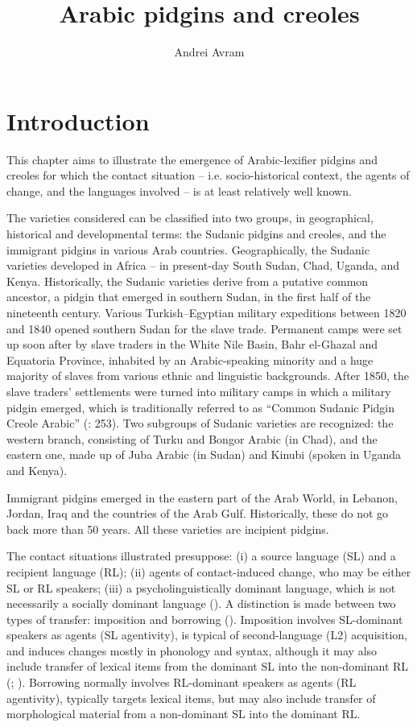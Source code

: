 \documentclass[output=paper]{langsci/langscibook}
\author{Andrei Avram\affiliation{University of Bucharest}}
\title{Arabic pidgins and creoles}
\begin{document}
\maketitle 


\section{Introduction}

This chapter aims to illustrate the emergence of Arabic-lexifier pidgins and creoles for which the contact situation – i.e. socio-historical context, the agents of change, and the languages involved – is at least relatively well known.

  The varieties considered can be classified into two groups, in geographical, historical and developmental terms: the Sudanic pidgins and creoles, and the immigrant pidgins in various Arab countries. Geographically, the Sudanic varieties developed in Africa – in present-day South Sudan, Chad, Uganda, and Kenya. Historically, the Sudanic varieties derive from a putative common ancestor, a pidgin that emerged in southern Sudan, in the first half of the nineteenth century. Various Turkish--Egyptian military expeditions between 1820 and 1840 opened southern Sudan for the slave trade. Permanent camps were set up soon after by slave traders in the White Nile Basin, Bahr el-Ghazal and Equatoria Province, inhabited by an Arabic-speaking minority and a huge majority of slaves from various ethnic and linguistic backgrounds. After 1850, the slave traders’ settlements were turned into military camps in which a military pidgin emerged, which is traditionally referred to as “Common Sudanic Pidgin Creole Arabic” (\citealt{ToscoManfredi2013}: 253). Two subgroups of Sudanic varieties are recognized: the western branch, consisting of Turku and Bongor Arabic (in Chad), and the eastern one, made up of Juba Arabic (in Sudan) and Kinubi (spoken in Uganda and Kenya). 

  Immigrant pidgins emerged in the eastern part of the Arab World, in Lebanon, Jordan, Iraq and the countries of the Arab Gulf. Historically, these do not go back more than 50 years. All these varieties are incipient pidgins.

  The contact situations illustrated presuppose: (i) a source language (SL) and a recipient language (RL); (ii) agents of contact-induced change, who may be either SL or RL speakers; (iii) a psycholinguistically dominant language, which is not necessarily a socially dominant language (\citealt{VanCoetsem1988,VanCoetsem1995,VanCoetsem2000,VanCoetsem2003,Winford2005,Winford2008}). A distinction is made between two types of transfer: imposition and borrowing (\citealt{VanCoetsem1988,VanCoetsem2000,VanCoetsem2003}). Imposition involves SL-dominant speakers as agents (SL agentivity), is typical of second-language (L2) acquisition, and induces changes mostly in phonology and syntax, although it may also include transfer of lexical items from the dominant SL into the non-dominant RL (\citealt[18]{VanCoetsem1995}; \citealt[376]{Winford2005}). Borrowing normally involves RL-dominant speakers as agents (RL agentivity), typically targets lexical items, but may also include transfer of morphological material from a non-dominant SL into the dominant RL.
\end{document}
